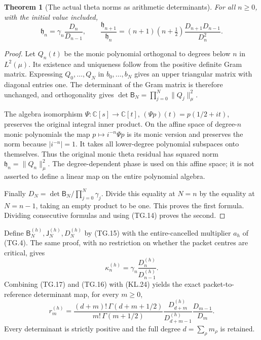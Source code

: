 \documentclass[11pt,a4paper]{article}
\newtheorem{theorem}{Theorem}[section]
\begin{document}
\begin{theorem}[The actual theta norms as arithmetic determinants]
For all \(n\geq0\), with the initial value included,
\[
 \boxed{\mathfrak h_n=\gamma_n\frac{D_n}{D_{n-1}},\qquad
 \frac{\mathfrak h_{n+1}}{\mathfrak h_n}
   =(n+1)(n+\tfrac12)\frac{D_{n+1}D_{n-1}}{D_n^2}.}
                                                               \tag{TG.16}
\]
\end{theorem}
\begin{proof}
Let \(Q_n(t)\) be the monic polynomial orthogonal to degrees below
\(n\) in \(L^2(\mu)\).  Its existence and uniqueness follow
from the positive definite Gram matrix.  Expressing
\(Q_0,\ldots,Q_N\) in \(b_0,\ldots,b_N\) gives an upper
triangular matrix with diagonal entries one.  The determinant of
the Gram matrix is therefore unchanged, and orthogonality gives
\(\det\mathsf B_N=\prod_{j=0}^N\|Q_j\|_\mu^2\).

The algebra isomorphism
\(\Psi:\mathbb C[s]\to\mathbb C[t]\),
\((\Psi p)(t)=p(1/2+it)\), preserves the original integral
inner product.  On the affine space of degree-\(n\) monic
polynomials the map \(p\mapsto i^{-n}\Psi p\) is its monic
version and preserves the norm because \(|i^{-n}|=1\).
It takes all lower-degree polynomial subspaces onto themselves.
Thus the original monic theta residual has squared norm
\(\mathfrak h_n=\|Q_n\|_\mu^2\).  The degree-dependent phase
is used on this affine space; it is not asserted to define a linear
map on the entire polynomial algebra.

Finally \(D_N=\det\mathsf B_N/\prod_{j=0}^N\gamma_j\).
Divide this equality at \(N=n\) by the equality at \(N=n-1\),
taking an empty product to be one.  This proves the first formula.
Dividing consecutive formulas and using (TG.14) proves the second.
\end{proof}

Define \(\mathsf B_N^{(h)},\mathsf J_N^{(h)},D_N^{(h)}\)
by (TG.15) with the entire-cancelled multiplier \(a_h\) of
(TG.4).  The same proof, with no restriction on whether the packet
centres are critical, gives
\[
 \kappa_n^{(h)}=\gamma_n\frac{D_n^{(h)}}{D_{n-1}^{(h)}}.
                                                               \tag{TG.17}
\]
Combining (TG.17) and (TG.16) with (KL.24) yields the exact
packet-to-reference determinant map, for every \(m\geq0\),
\[
 \boxed{r_m^{(h)}=
  \frac{(d+m)!\,\Gamma(d+m+1/2)}{m!\,\Gamma(m+1/2)}
  \frac{D_{d+m}^{(h)}}{D_{d+m-1}^{(h)}}
  \frac{D_{m-1}}{D_m}.}
                                                               \tag{TG.18}
\]
Every determinant is strictly positive and the full degree
\(d=\sum_\rho m_\rho\) is retained.
\end{document}
